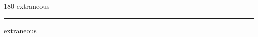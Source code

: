 
\begin{frame}
\begin{center}
\begin{turn}{180}
{\fontsize{2.5cm}{1em}\selectfont extraneous}
\end{turn}
\vspace{1em}\par  
\hrule
\vspace{1em}\par  
{\fontsize{2.5cm}{1em}\selectfont extraneous}
\end{center}
\end{frame}
